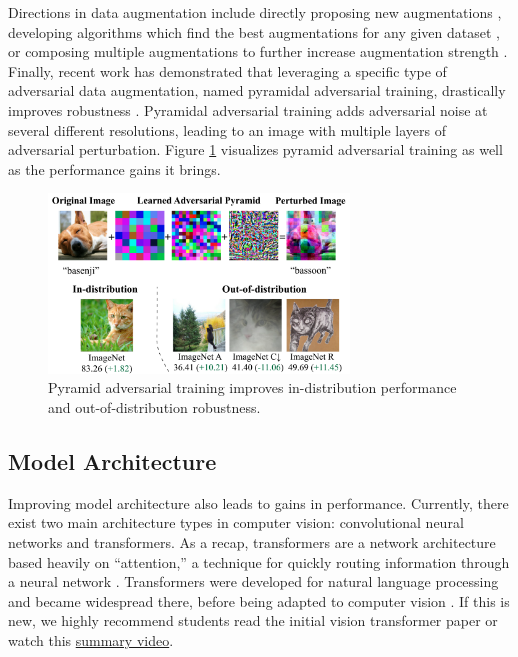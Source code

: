 \documentclass{article}
\begin{document}
Directions in data augmentation include directly proposing new augmentations \cite{zhang2018mixup, geirhos2019imagenettrained, hendrycks2021faces, hendrycks2021pixmix}, developing algorithms which find the best augmentations for any given dataset \cite{cubuk2019autoaugment, cubuk2019randaugment}, or composing multiple augmentations to further increase augmentation strength \cite{hendrycks2020augmix, hendrycks2021pixmix}. Finally, recent work has demonstrated that leveraging a specific type of adversarial data augmentation, named pyramidal adversarial training, drastically improves robustness \cite{herrmann2021pyramid}. Pyramidal adversarial training adds adversarial noise at several different resolutions, leading to an image with multiple layers of adversarial perturbation. Figure \ref{fig:pyramid} visualizes pyramid adversarial training as well as the performance gains it brings.

\begin{figure}
    \centering
    \includegraphics[width=8cm]{images/pyramid.png}
    \caption{Pyramid adversarial training improves in-distribution performance and out-of-distribution robustness.}
    \label{fig:pyramid}
\end{figure}

\subsection{Model Architecture}
Improving model architecture also leads to gains in performance. Currently, there exist two main architecture types in computer vision: convolutional neural networks and transformers. As a recap, transformers are a network architecture based heavily on ``attention,'' a technique for quickly routing information through a neural network \cite{vaswani2017attention}. Transformers were developed for natural language processing and became widespread there, before being adapted to computer vision \cite{dosovitskiy2021image}. If this is new, we highly recommend students read the initial vision transformer paper \cite{dosovitskiy2021image} or watch this \href{https://www.youtube.com/watch?v=TrdevFK_am4}{summary video}.
\end{document}
